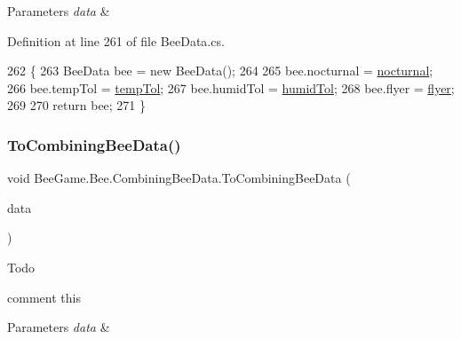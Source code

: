 \begin{DoxyParams}{Parameters}
{\em data} & \\
\hline
\end{DoxyParams}


Definition at line 261 of file Bee\+Data.\+cs.


\begin{DoxyCode}
262         \{
263             BeeData bee = \textcolor{keyword}{new} BeeData();
264 
265             bee.nocturnal = \hyperlink{struct_bee_game_1_1_bee_1_1_combining_bee_data_a337800df462a764c58328d21d2398d6c}{nocturnal};
266             bee.tempTol = \hyperlink{struct_bee_game_1_1_bee_1_1_combining_bee_data_a31cebfaca3139379e30a43fa0ac7e338}{tempTol};
267             bee.humidTol = \hyperlink{struct_bee_game_1_1_bee_1_1_combining_bee_data_a98c56c89bcd5f983b4d022c113f789e3}{humidTol};
268             bee.flyer = \hyperlink{struct_bee_game_1_1_bee_1_1_combining_bee_data_ac0af7556cf90035ff830a6e121e8d4c4}{flyer};
269 
270             \textcolor{keywordflow}{return} bee;
271         \}
\end{DoxyCode}
\mbox{\label{struct_bee_game_1_1_bee_1_1_combining_bee_data_abdf4646728337da76097aed9b74347ae}} 
\subsubsection{\texorpdfstring{To\+Combining\+Bee\+Data()}{ToCombiningBeeData()}}
{\footnotesize\ttfamily void Bee\+Game.\+Bee.\+Combining\+Bee\+Data.\+To\+Combining\+Bee\+Data (\begin{DoxyParamCaption}\item[{\hyperlink{struct_bee_game_1_1_bee_1_1_bee_data}{Bee\+Data}}]{data }\end{DoxyParamCaption})}





\begin{DoxyRefDesc}{Todo}
\item[\hyperlink{todo__todo000002}{Todo}]comment this \end{DoxyRefDesc}

\begin{DoxyParams}{Parameters}
{\em data} & \\
\hline
\end{DoxyParams}


